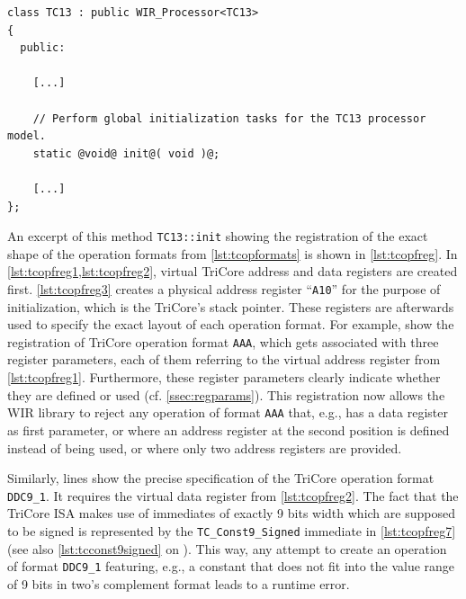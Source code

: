 \begin{lstlisting}[style=code,float=h]
class TC13 : public WIR_Processor<TC13>
{
  public:

    [...]

    // Perform global initialization tasks for the TC13 processor model.
    static @void@ init@( void )@;

    [...]
};
\end{lstlisting}

An excerpt of this method \texttt{TC13::init} showing the registration of the exact shape of the operation formats from \cref{lst:tcopformats} is shown in \cref{lst:tcopfreg}.
In \cref{lst:tcopfreg1,lst:tcopfreg2}, virtual TriCore address and data registers are created first.
\cref{lst:tcopfreg3} creates a physical address register ``\texttt{A10}'' for the purpose of initialization, which is the TriCore's stack pointer.
These registers are afterwards used to specify the exact layout of each operation format.
For example,  show the registration of TriCore operation format \texttt{AAA}, which gets associated with three register parameters, each of them referring to the virtual address register from \cref{lst:tcopfreg1}.
Furthermore, these register parameters clearly indicate whether they are defined or used (cf. \cref{ssec:regparams}).
This registration now allows the \gls{WIR} library to reject any operation of format \texttt{AAA} that, e.g., has a data register as first parameter, or where an address register at the second position is defined instead of being used, or where only two address registers are provided.

Similarly, lines  show the precise specification of the TriCore operation format \texttt{DDC9\_1}.
It requires the virtual data register from \cref{lst:tcopfreg2}.
The fact that the TriCore \gls{ISA} makes use of immediates of exactly 9 bits width which are supposed to be signed is represented by the \texttt{TC\_Const9\_Signed} immediate in \cref{lst:tcopfreg7} (see also \cref{lst:tcconst9signed} on ).
This way, any attempt to create an operation of format \texttt{DDC9\_1} featuring, e.g., a constant that does not fit into the value range of 9 bits in two's complement format leads to a runtime error.


